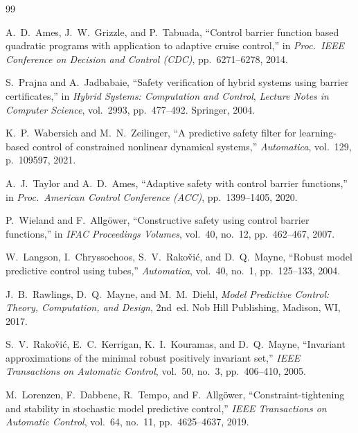 \begin{thebibliography}{99}

A.~D.~Ames, J.~W.~Grizzle, and P.~Tabuada,
``Control barrier function based quadratic programs with application to adaptive cruise control,''
in \emph{Proc.\ IEEE Conference on Decision and Control (CDC)}, pp.~6271--6278, 2014.

S.~Prajna and A.~Jadbabaie,
``Safety verification of hybrid systems using barrier certificates,''
in \emph{Hybrid Systems: Computation and Control},
\emph{Lecture Notes in Computer Science}, vol.~2993, pp.~477--492. Springer, 2004.

K.~P.~Wabersich and M.~N.~Zeilinger,
``A predictive safety filter for learning-based control of constrained nonlinear dynamical systems,''
\emph{Automatica}, vol.~129, p.~109597, 2021.

A.~J.~Taylor and A.~D.~Ames,
``Adaptive safety with control barrier functions,''
in \emph{Proc.\ American Control Conference (ACC)}, pp.~1399--1405, 2020.

P.~Wieland and F.~Allg\"{o}wer,
``Constructive safety using control barrier functions,''
in \emph{IFAC Proceedings Volumes}, vol.~40, no.~12, pp.~462--467, 2007.


W.~Langson, I.~Chryssochoos, S.~V.~Rako\v{v}i\'{c}, and D.~Q.~Mayne,
``Robust model predictive control using tubes,''
\emph{Automatica}, vol.~40, no.~1, pp.~125--133, 2004.

J.~B.~Rawlings, D.~Q.~Mayne, and M.~M.~Diehl,
\emph{Model Predictive Control: Theory, Computation, and Design}, 2nd~ed.
Nob Hill Publishing, Madison, WI, 2017.

S.~V.~Rako\v{v}i\'{c}, E.~C.~Kerrigan, K.~I.~Kouramas, and D.~Q.~Mayne,
``Invariant approximations of the minimal robust positively invariant set,''
\emph{IEEE Transactions on Automatic Control}, vol.~50, no.~3, pp.~406--410, 2005.

M.~Lorenzen, F.~Dabbene, R.~Tempo, and F.~Allg\"{o}wer,
``Constraint-tightening and stability in stochastic model predictive control,''
\emph{IEEE Transactions on Automatic Control}, vol.~64, no.~11, pp.~4625--4637, 2019.


\end{thebibliography}
